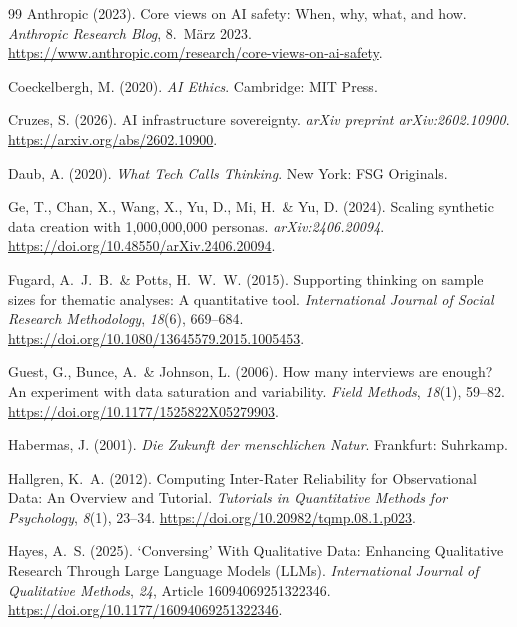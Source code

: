 \documentclass[12pt,a4paper]{article}
\begin{document}
\begin{thebibliography}{99}
  Anthropic (2023).
  Core views on AI safety: When, why, what, and how.
  \textit{Anthropic Research Blog}, 8.~März 2023.
  \url{https://www.anthropic.com/research/core-views-on-ai-safety}.

  Coeckelbergh, M. (2020).
  \textit{AI Ethics}.
  Cambridge: MIT Press.

  Cruzes, S. (2026).
  AI infrastructure sovereignty.
  \textit{arXiv preprint arXiv:2602.10900}.
  \url{https://arxiv.org/abs/2602.10900}.

  Daub, A. (2020).
  \textit{What Tech Calls Thinking}.
  New York: FSG Originals.

  Ge, T., Chan, X., Wang, X., Yu, D., Mi, H.~\& Yu, D. (2024).
  Scaling synthetic data creation with 1{,}000{,}000{,}000 personas.
  \textit{arXiv:2406.20094}.
  \url{https://doi.org/10.48550/arXiv.2406.20094}.


  Fugard, A.~J.~B.~\& Potts, H.~W.~W. (2015).
  Supporting thinking on sample sizes for thematic analyses: A quantitative tool.
  \textit{International Journal of Social Research Methodology}, \textit{18}(6), 669--684.
  \url{https://doi.org/10.1080/13645579.2015.1005453}.

  Guest, G., Bunce, A.~\& Johnson, L. (2006).
  How many interviews are enough? An experiment with data saturation and variability.
  \textit{Field Methods}, \textit{18}(1), 59--82.
  \url{https://doi.org/10.1177/1525822X05279903}.

  Habermas, J. (2001).
  \textit{Die Zukunft der menschlichen Natur}.
  Frankfurt: Suhrkamp.

  Hallgren, K.~A. (2012).
  Computing Inter-Rater Reliability for Observational Data: An Overview and Tutorial.
  \textit{Tutorials in Quantitative Methods for Psychology}, \textit{8}(1), 23--34.
  \url{https://doi.org/10.20982/tqmp.08.1.p023}.

  Hayes, A.~S. (2025).
  `Conversing' With Qualitative Data: Enhancing Qualitative Research Through Large Language Models (LLMs).
  \textit{International Journal of Qualitative Methods}, \textit{24}, Article 16094069251322346.
  \url{https://doi.org/10.1177/16094069251322346}.


\end{thebibliography}
\end{document}
